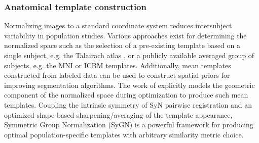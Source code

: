 \subsubsection{Anatomical template construction}

Normalizing images to a standard coordinate system
reduces intersubject variability in population studies.  Various
approaches exist for determining the normalized space such as the selection
of a pre-existing template based on a single subject, e.g. the Talairach
atlas \citep{Talairach1988}, or a publicly available averaged group of
subjects, e.g. the MNI \citep{Collins1994} or ICBM \citep{Mazziotta1995}
templates.  Additionally, mean templates constructed from labeled
data can be used to construct spatial priors for improving segmentation
algorithms.
The work of \cite{avants2010} explicitly models the geometric component of the 
normalized space during optimization to produce such mean templates.  Coupling the intrinsic symmetry of 
SyN pairwise registration \citep{avants2011} and an
optimized shape-based sharpening/averaging of the template appearance, Symmetric Group
Normalization (SyGN) is a powerful framework for producing optimal population-specific
templates \citep{avants2010} with arbitrary similarity metric choice.  




